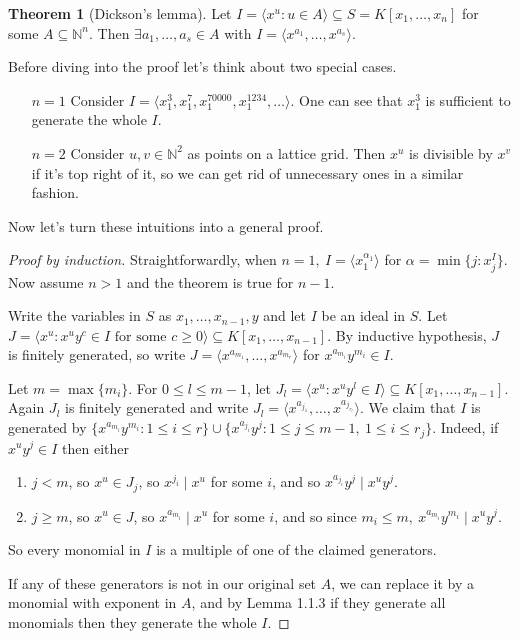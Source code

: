 \documentclass[a4paper]{article}
\theoremstyle{definition}
\newtheorem{thm}[defn]{Theorem}
\begin{document}
\begin{thm}[Dickson's lemma]
Let $I=\langle x^u:u\in A\rangle \subseteq S=K[x_1,\ldots,x_n]$ for some $A\subseteq \mathbb N^n$. Then $\exists a_1,\ldots,a_s\in A$ with $I=\langle x^{a_1},\ldots,x^{a_s} \rangle$.
\end{thm}
Before diving into the proof let's think about two special cases.
\begin{itemize}
\item[$n=1$] Consider $I=\langle x_1^3,x_1^7,x_1^{70000},x_1^{1234},\ldots\rangle$. One can see that $x_1^3$ is sufficient to generate the whole $I$.
\item[$n=2$] Consider $u,v\in\mathbb N^2$ as points on a lattice grid. Then $x^u$ is divisible by $x^v$ if it's top right of it, so we can get rid of unnecessary ones in a similar fashion.
\end{itemize}
Now let's turn these intuitions into a general proof.
\begin{proof}[Proof by induction]
Straightforwardly, when $n=1,\ I=\langle x_1^{\alpha_1}\rangle$ for $\alpha=\min \{j:x_j^I \}$. Now assume $n>1$ and the theorem is true for $n-1$.

Write the variables in $S$ as $x_1,\ldots,x_{n-1},y$ and let $I$ be an ideal in $S$. Let $J=\langle x^u:x^uy^c\in I\text{ for some }c\geq 0\rangle\subseteq K[x_1,\ldots,x_{n-1}]$. By inductive hypothesis, $J$ is finitely generated, so write $J=\langle x^{a_{m_1}}, \ldots, x^{a_{m_r}}\rangle $ for $x^{a_{m_i}}y^{m_i}\in I$.

Let $m=\max \{m_i\}$. For $0\leq l\leq m-1$, let $J_l=\langle x^u:x^u y^l\in I\rangle\subseteq K[x_1,\ldots,x_{n-1}]$. Again $J_l$ is finitely generated and write $J_l=\langle x^{a_{j_1}},\ldots,x^{a_{j_{r_l}}}\rangle$. We claim that $I$ is generated by $\{x^{a_{m_i}} y^{m_i}:1\leq i\leq r\} \cup \{x^{a_{j_i}}y^{j} : 1\leq j\leq m-1,\ 1\leq i\leq r_j\}$. Indeed, if $x^u y^j\in I$ then either
\begin{enumerate}
\item $j<m$, so $x^u\in J_j$, so  $x^{j_i} \mid x^u$ for some $i$, and so $x^{a_{j_i}} y^j\mid x^u y^j$.
\item $j\geq m$, so $x^u\in J$, so $x^{a_{m_i}} \mid x^u$ for some $i$, and so since $m_i\leq m,\ x^{a_{m_i}} y^{m_i}\mid x^u y^j$.
\end{enumerate}
So every monomial in $I$ is a multiple of one of the claimed generators.

If any of these generators is not in our original set $A$, we can replace it by a monomial with exponent in $A$, and by Lemma 1.1.3 if they generate all monomials then they generate the whole $I$.
\end{proof}
\end{document}
